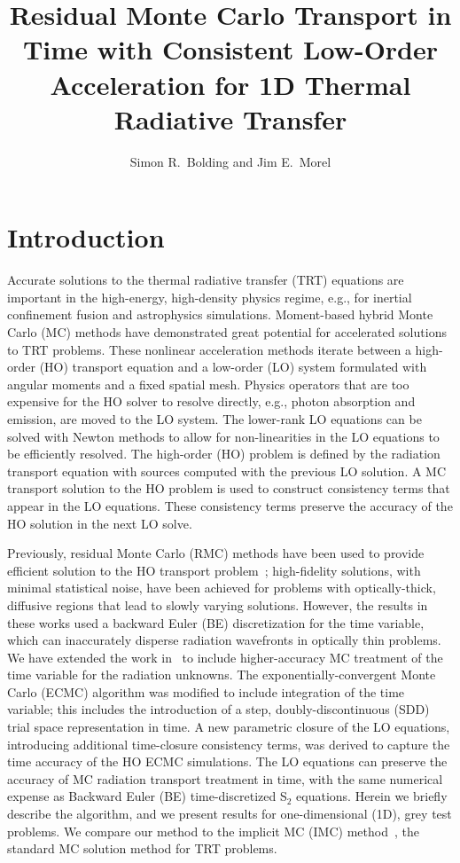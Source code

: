 \documentclass{anstrans}
\title{Residual Monte Carlo Transport in Time with Consistent Low-Order Acceleration for
    1D Thermal Radiative Transfer}
\author{Simon R.~Bolding and Jim E.~Morel}
\institute{Texas A\&M University Nuclear Engineering Department, 
}
\begin{document}
\section{Introduction}

Accurate solutions to the thermal radiative transfer (TRT) equations are important in the
high-energy, high-density physics regime, e.g., for inertial
confinement fusion and astrophysics simulations.  Moment-based hybrid Monte Carlo (MC)
methods have demonstrated great potential for accelerated
solutions to TRT problems.   These nonlinear acceleration methods iterate between a
high-order (HO) transport equation and a low-order (LO) system formulated with angular moments
and a fixed spatial mesh.  Physics operators that
are too expensive for the HO solver to resolve directly, e.g., photon absorption and emission,
are moved to the LO system. The lower-rank LO equations can be solved with Newton
methods to allow for non-linearities in the LO equations to be efficiently
resolved.  The high-order (HO) problem is defined by the radiation transport equation with
sources computed with the previous LO solution. A MC transport solution to the HO
problem is used to construct consistency terms that appear in the LO equations. These consistency terms preserve the accuracy of the HO
solution in the next LO solve.

Previously, residual Monte Carlo (RMC) methods have been used to provide efficient
solution to the HO transport problem~\cite{rmc,bolding_nse}; high-fidelity solutions,
with minimal statistical noise, have been achieved for problems with optically-thick, diffusive
regions that lead to slowly varying
solutions.  However, the results in these works used a backward
Euler (BE) discretization for the time variable, which can inaccurately disperse radiation
wavefronts in optically thin problems. We have extended the work
in~\cite{bolding_nse} to include higher-accuracy MC treatment of the time variable for the
radiation unknowns. The exponentially-convergent Monte Carlo (ECMC)
algorithm was modified to include integration of the time variable;
this includes the introduction of a step, doubly-discontinuous (SDD) trial space representation
in time.  A new
parametric closure of the LO equations, introducing additional time-closure consistency
terms, was derived to capture the time accuracy of the HO
ECMC simulations.  The LO equations can preserve the accuracy of MC radiation transport treatment in
time, with the same numerical expense as Backward Euler (BE) time-discretized S$_2$
equations. 
Herein we briefly describe the algorithm, and we present results for
one-dimensional (1D), grey test problems.  We compare our method to the implicit MC
(IMC) method~\cite{fnc}, the standard MC solution
method for TRT problems.
\end{document}

